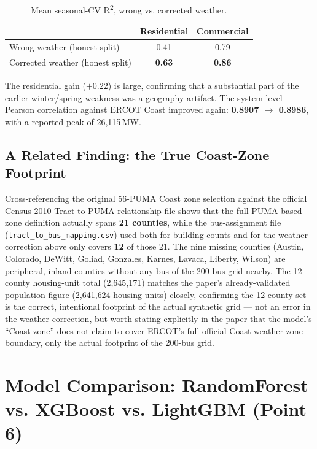 \documentclass[11pt]{article}
\begin{document}
\begin{table}[H]
\centering
\begin{tabular}{lcc}
\toprule
 & Residential & Commercial \\
\midrule
Wrong weather (honest split) & 0.41 & 0.79 \\
Corrected weather (honest split) & \textbf{0.63} & \textbf{0.86} \\
\bottomrule
\end{tabular}
\caption{Mean seasonal-CV R\textsuperscript{2}, wrong vs. corrected weather.}
\end{table}

The residential gain ($+0.22$) is large, confirming that a substantial part of the
earlier winter/spring weakness was a geography artifact. The system-level Pearson
correlation against ERCOT Coast improved again: \textbf{0.8907 $\rightarrow$
0.8986}, with a reported peak of 26{,}115\,MW.

\subsection{A Related Finding: the True Coast-Zone Footprint}

Cross-referencing the original 56-PUMA Coast zone selection against the official
Census 2010 Tract-to-PUMA relationship file shows that the full PUMA-based zone
definition actually spans \textbf{21 counties}, while the bus-assignment file
(\texttt{tract\_to\_bus\_mapping.csv}) used both for building counts and for the
weather correction above only covers \textbf{12} of those 21. The nine missing
counties (Austin, Colorado, DeWitt, Goliad, Gonzales, Karnes, Lavaca, Liberty,
Wilson) are peripheral, inland counties without any bus of the 200-bus grid nearby.
The 12-county housing-unit total (2{,}645{,}171) matches the paper's already-validated
population figure (2{,}641{,}624 housing units) closely, confirming the 12-county set
is the correct, intentional footprint of the actual synthetic grid --- not an error in
the weather correction, but worth stating explicitly in the paper that the model's
``Coast zone'' does not claim to cover ERCOT's full official Coast weather-zone
boundary, only the actual footprint of the 200-bus grid.

\section{Model Comparison: RandomForest vs. XGBoost vs. LightGBM (Point 6)}
\label{sec:models}
\end{document}
